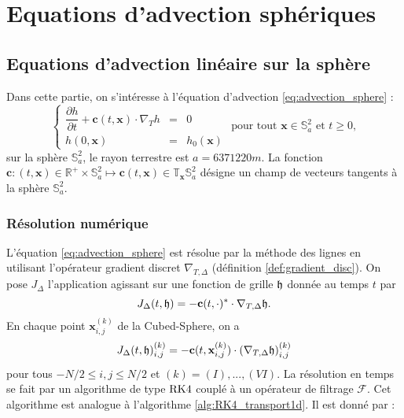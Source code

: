 
\chapter{Equations d'advection sphériques}
\label{chap:advection}

\section{Equations d'advection linéaire sur la sphère}

Dans cette partie, on s'intéresse à l'équation d'advection \eqref{eq:advection_sphere} :
\begin{equation}
\left\lbrace
\begin{array}{rcl}
\dfrac{\partial h}{\partial t} + \mathbf{c}(t,\mathbf{x}) \cdot \nabla_T h & = & 0 \\
h(0,\mathbf{x}) & = & h_0(\mathbf{x})
\end{array}
\right. \text{ pour tout } \mathbf{x} \in \mathbb{S}_a^2 \text{ et } t \geq 0,
\label{eq:advection_sphere}
\end{equation}
sur la sphère $\mathbb{S}_a^2$, le rayon terrestre est $a = 6 371 220 \si{m}$.
La fonction $\mathbf{c} : (t,\mathbf{x}) \in \mathbb{R}^+ \times \mathbb{S}_a^2 \mapsto \mathbf{c}(t,\mathbf{x}) \in \mathbb{T}_{\mathbf{x}} \mathbb{S}_a^2$ désigne un champ de vecteurs tangents à la sphère $\mathbb{S}_a^2$.

\subsection{Résolution numérique}

L'équation \eqref{eq:advection_sphere} est résolue par la méthode des lignes en utilisant l'opérateur gradient discret $\nabla_{T,\Delta}$ (définition \ref{def:gradient_disc}). On pose $J_{\Delta}$ l'application agissant sur une fonction de grille $\mathfrak{h}$ donnée au temps $t$ par
\begin{equation}
J_{\Delta}(t, \mathfrak{h}) = - \mathbf{c}(t,\cdot)^* \cdot \nabla_{T,\Delta} \mathfrak{h}.
\end{equation}
En chaque point $\mathbf{x}_{i,j}^{(k)}$ de la Cubed-Sphere, on a
\begin{equation}
J_{\Delta}(t, \mathfrak{h})_{i,j}^{(k)} = - \mathbf{c}(t,\mathbf{x}_{i,j}^{(k)}) \cdot \left(\nabla_{T,\Delta} \mathfrak{h}\right)_{i,j}^{(k)}
\end{equation}
pour tous $-N/2 \leq i,j \leq N/2$ et $(k) = (I), ..., (VI)$.
La résolution en temps se fait par un algorithme de type $\RK4$ couplé à un opérateur de filtrage $\mathcal{F}$. Cet algorithme est analogue à l'algorithme \ref{alg:RK4_transport1d}. Il est donné par :

